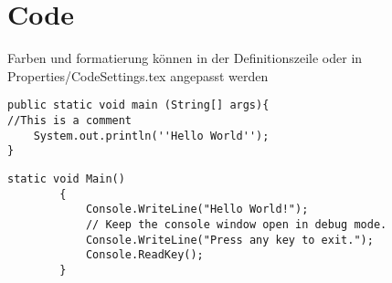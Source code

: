 \chapter{Code}

Farben und formatierung können in der Definitionszeile oder in Properties/CodeSettings.tex angepasst werden

\begin{lstlisting}[frame=none,label={java},caption={Java}] 
public static void main (String[] args){
//This is a comment
	System.out.println(''Hello World'');
}
\end{lstlisting}

\begin{lstlisting}[language={[Sharp]C},label={csharp},caption={CSharp}]
static void Main() 
        {
            Console.WriteLine("Hello World!");
            // Keep the console window open in debug mode.
            Console.WriteLine("Press any key to exit.");
            Console.ReadKey();
        }
\end{lstlisting}